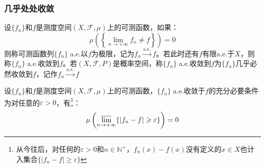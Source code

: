 \subsubsection{几乎处处收敛}
\begin{definition}
	设$\{f_n\}$和$f$是测度空间$(X,\mathscr{F},\mu)$上的可测函数，如果：
	\begin{equation*}
		\mu\left(\left\{\lim_{n\to+\infty}f_n\ne f\right\}\right)=0
	\end{equation*}
	则称可测函数列$\{f_n\}\;$a.e.以$f$为极限，记为$f_n\overset{\text{a.e.}}{\longrightarrow}f$。若此时还有$f$有限a.e.于$X$，则称$\{f_n\}\;$a.e.收敛到$f$。若$(X,\mathscr{F},P)$是概率空间，称$\{f_n\}\;$a.e.收敛到$f$为$\{f_n\}$几乎必然收敛到$f$，记作$f_n\overset{\text{a.s.}}{\longrightarrow}f$
\end{definition}
\begin{theorem}\label{theo:EquiConditiona.e.}
	设$\{f_n\}$和$f$是测度空间$(X,\mathscr{F},\mu)$上的可测函数，$\{f_n\}\;$a.e.收敛于$f$的充分必要条件为对任意的$\varepsilon>0$，有\footnote{从今往后，对任何的$\varepsilon>0$和$n\in\mathbb{N}^+$，$f_n(x)-f(x)$没有定义的$x\in X$也计入集合$\{|f_n-f|\geqslant\varepsilon\}$}：
	\begin{equation*}
		\mu\left(\varlimsup_{n\to+\infty}\{|f_n-f|\geqslant\varepsilon\}\right)=0
	\end{equation*}
\end{theorem}
